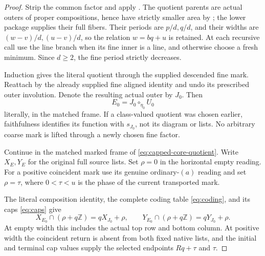 \documentclass[11pt,a4paper]{amsart}
\numberwithin{equation}{section}
\theoremstyle{plain}
\theoremstyle{definition}
\newcommand{\Z}{\mathbb Z}
\begin{document}
\begin{proof}
Strip the common factor and apply .  The quotient
parents are actual outers of proper compositions, hence have
strictly smaller area by ; the lower package
supplies their full fibers.  Their periods are \(p/d,q/d\), and
their widths are \((w-v)/d,(u-v)/d\), so the relation
\(w=bq+u\) is retained.  At each recursive call use the line branch
when its fine inner is a line, and otherwise choose a fresh minimum.
Since \(d\ge2\), the fine period strictly decreases.

Induction gives the literal quotient through the supplied descended
fine mark.  Reattach by the already supplied fine aligned identity
and undo its prescribed outer involution.  Denote the resulting
actual outer by \(J_0\).  Then
\begin{equation}\label{eq:capped-core-quotient}
 E_0=J_0\circ_{\eta_0}U_0
\end{equation}
literally, in the matched frame.  If a class-valued quotient was
chosen earlier, faithfulness identifies its function with \(s_{J_0}\),
not its diagram or lists.  No arbitrary coarse mark is lifted
through a newly chosen fine factor.

Continue in the matched marked frame of
\eqref{eq:capped-core-quotient}.  Write \(X_E,Y_E\) for the original
full source lists.  Set \(\rho=0\) in the horizontal empty reading.
For a positive coincident mark use its genuine ordinary-\((a)\)
reading and set \(\rho=\tau\), where \(0<\tau<u\) is the phase of
the current transported mark.

The literal composition identity, the complete coding table
\eqref{eq:coding}, and its caps \eqref{eq:caps} give
\[
 X_{E_0}\cap(\rho+q\Z)=qX_{J_0}+\rho,\qquad
 Y_{E_0}\cap(\rho+q\Z)=qY_{J_0}+\rho.
\]
At empty width this includes the actual top row and bottom column.
At positive width the coincident return is absent from both fixed
native lists, and the initial and terminal cap values supply the
selected endpoints \(Rq+\tau\) and \(\tau\).


\end{proof}
\end{document}
